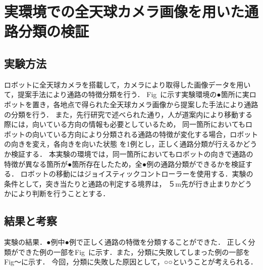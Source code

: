 \documentclass[../main]{subfiles}
\begin{document}
    \section{実環境での全天球カメラ画像を用いた通路分類の検証}
        \subsection{実験方法}
        ロボットに全天球カメラを搭載して，カメラにより取得した画像データを用いて，提案手法により通路の特徴分類を行う．
        Fig~に示す実験環境の●箇所に実ロボットを置き，各地点で得られた全天球カメラ画像から提案した手法により通路の分類を行う．
        また，先行研究で述べられた通り，人が道案内により移動する際には，向いている方向の情報も必要としているため，
        同一箇所においてもロボットの向いている方向により分類される通路の特徴が変化する場合，ロボットの向きを変え，各向きを向いた状態
        を1例とし，正しく通路分類が行えるかどうか検証する．
        本実験の環境では，同一箇所においてもロボットの向きで通路の特徴が異なる箇所が●箇所存在したため，全●例の通路分類ができるかを検証する．
        ロボットの移動にはジョイスティックコントローラーを使用する．実験の条件として，突き当たりと通路の判定する境界は，
        ５m先が行き止まりかどうかにより判断を行うこととする．

        \subsection{結果と考察}
        実験の結果．●例中●例で正しく通路の特徴を分類することができた．
        正しく分類ができた例の一部をFig~に示す．また，分類に失敗してしまった例の一部をFig〜に示す．
        今回，分類に失敗した原因として，○○ということが考えられる．
\end{document}
